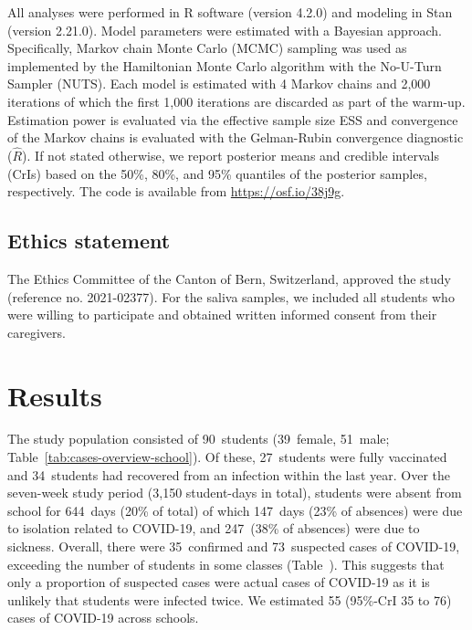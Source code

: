 \documentclass[fleqn,11pt]{wlscirep}
\begin{document}
\noindent All analyses were performed in R software (version 4.2.0)\cite{RCoreTeam2022} and modeling in Stan (version 2.21.0)\cite{Carpenter2017}. Model parameters were estimated with a Bayesian approach. Specifically, Markov chain Monte Carlo (MCMC) sampling was used as implemented by the Hamiltonian Monte Carlo algorithm with the No-U-Turn Sampler (NUTS)\cite{Hoffman2014}. Each model is estimated with 4 Markov chains and 2,000 iterations of which the first 1,000 iterations are discarded as part of the warm-up. Estimation power is evaluated via the effective sample size ESS and convergence of the Markov chains is evaluated with the Gelman-Rubin convergence diagnostic ($\hat{R}$). If not stated otherwise, we report posterior means and credible intervals (CrIs) based on the 50\%, 80\%, and 95\% quantiles of the posterior samples, respectively. The code is available from \url{https://osf.io/38j9g}.



\subsection{Ethics statement}

\noindent The Ethics Committee of the Canton of Bern, Switzerland, approved the study (reference no. 2021-02377). For the saliva samples, we included all students who were willing to participate and obtained written informed consent from their caregivers.


\newpage

\section{Results}

The study population consisted of 90~students (39~female, 51~male; Table~\ref{tab:cases-overview-school}). Of these, 27~students were fully vaccinated and 34~students had recovered from an infection within the last year. Over the seven-week study period (3,150 student-days in total), students were absent from school for 644~days (20\% of total) of which 147~days (23\% of absences) were due to isolation related to COVID-19, and 247~(38\% of absences) were due to sickness. Overall, there were 35~confirmed and 73~suspected cases of COVID-19, exceeding the number of students in some classes (Table~). This suggests that only a proportion of suspected cases were actual cases of COVID-19 as it is unlikely that students were infected twice. We estimated 55 (95\%-CrI 35 to 76) cases of COVID-19 across schools.  
\end{document}
